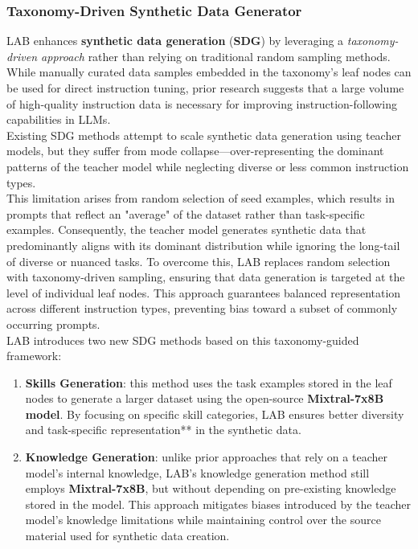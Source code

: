 \documentclass[12pt]{article}
\begin{document}
\subsubsection{Taxonomy-Driven Synthetic Data Generator}
LAB enhances \textbf{synthetic data generation} (\textbf{SDG}) by leveraging a \textit{taxonomy-driven approach} rather than relying on traditional random sampling methods.\\
While manually curated data samples embedded in the taxonomy’s leaf nodes can be used for direct instruction tuning, prior research suggests that a large volume of high-quality instruction data is necessary for improving instruction-following capabilities in LLMs.\vspace{14pt}\\
Existing SDG methods attempt to scale synthetic data generation using teacher models, but they suffer from mode collapse—over-representing the dominant patterns of the teacher model while neglecting diverse or less common instruction types.\vspace{14pt}\\
This limitation arises from random selection of seed examples, which results in prompts that reflect an "average" of the dataset rather than task-specific examples. Consequently, the teacher model generates synthetic data that predominantly aligns with its dominant distribution while ignoring the long-tail of diverse or nuanced tasks. To overcome this, LAB replaces random selection with taxonomy-driven sampling, ensuring that data generation is targeted at the level of individual leaf nodes. This approach guarantees balanced representation across different instruction types, preventing bias toward a subset of commonly occurring prompts.\vspace{14pt}\\
LAB introduces two new SDG methods based on this taxonomy-guided framework:
\begin{enumerate}
    \item \textbf{Skills Generation}: this method uses the task examples stored in the leaf nodes to generate a larger dataset using the open-source \textbf{Mixtral-7x8B model}. By focusing on specific skill categories, LAB ensures better diversity and task-specific representation** in the synthetic data.  
    \item \textbf{Knowledge Generation}: unlike prior approaches that rely on a teacher model’s internal knowledge, LAB’s knowledge generation method still employs \textbf{Mixtral-7x8B}, but without depending on pre-existing knowledge stored in the model. This approach mitigates biases introduced by the teacher model’s knowledge limitations while maintaining control over the source material used for synthetic data creation.  
\end{enumerate}
\end{document}
